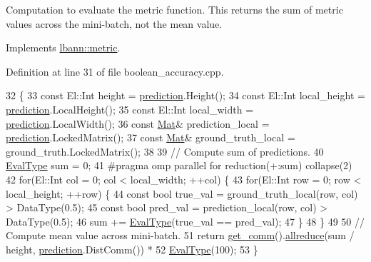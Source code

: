 Computation to evaluate the metric function. This returns the sum of metric values across the mini-\/batch, not the mean value. 

Implements \hyperlink{classlbann_1_1metric_aab79147ff480675db2e01d7a889a4296}{lbann\+::metric}.



Definition at line 31 of file boolean\+\_\+accuracy.\+cpp.


\begin{DoxyCode}
32                                                                                    \{
33   \textcolor{keyword}{const} El::Int height = \hyperlink{base_8hpp_a2781a159088df64ed7d47cc91c4dc0a8ac41b9ec75e920b610e8907e066074b30}{prediction}.Height();
34   \textcolor{keyword}{const} El::Int local\_height = \hyperlink{base_8hpp_a2781a159088df64ed7d47cc91c4dc0a8ac41b9ec75e920b610e8907e066074b30}{prediction}.LocalHeight();
35   \textcolor{keyword}{const} El::Int local\_width = \hyperlink{base_8hpp_a2781a159088df64ed7d47cc91c4dc0a8ac41b9ec75e920b610e8907e066074b30}{prediction}.LocalWidth();
36   \textcolor{keyword}{const} \hyperlink{base_8hpp_a68f11fdc31b62516cb310831bbe54d73}{Mat}& prediction\_local = \hyperlink{base_8hpp_a2781a159088df64ed7d47cc91c4dc0a8ac41b9ec75e920b610e8907e066074b30}{prediction}.LockedMatrix();
37   \textcolor{keyword}{const} \hyperlink{base_8hpp_a68f11fdc31b62516cb310831bbe54d73}{Mat}& ground\_truth\_local = ground\_truth.LockedMatrix();
38 
39   \textcolor{comment}{// Compute sum of predictions.}
40   \hyperlink{base_8hpp_a3266f5ac18504bbadea983c109566867}{EvalType} sum = 0;
41 \textcolor{preprocessor}{  #pragma omp parallel for reduction(+:sum) collapse(2)}
42   \textcolor{keywordflow}{for}(El::Int col = 0; col < local\_width; ++col) \{
43     \textcolor{keywordflow}{for}(El::Int row = 0; row < local\_height; ++row) \{
44       \textcolor{keyword}{const} \textcolor{keywordtype}{bool} true\_val = ground\_truth\_local(row, col) > DataType(0.5);
45       \textcolor{keyword}{const} \textcolor{keywordtype}{bool} pred\_val = prediction\_local(row, col) > DataType(0.5);
46       sum += \hyperlink{base_8hpp_a3266f5ac18504bbadea983c109566867}{EvalType}(true\_val == pred\_val);
47     \}
48   \}
49   
50   \textcolor{comment}{// Compute mean value across mini-batch.}
51   \textcolor{keywordflow}{return} \hyperlink{classlbann_1_1metric_a464120720df6bfdf91bffe353e562964}{get\_comm}().\hyperlink{classlbann_1_1lbann__comm_af5631e5f0f54e4df4958eba9df2599ef}{allreduce}(sum / height, \hyperlink{base_8hpp_a2781a159088df64ed7d47cc91c4dc0a8ac41b9ec75e920b610e8907e066074b30}{prediction}.DistComm()) *
52     \hyperlink{base_8hpp_a3266f5ac18504bbadea983c109566867}{EvalType}(100);
53 \}
\end{DoxyCode}
